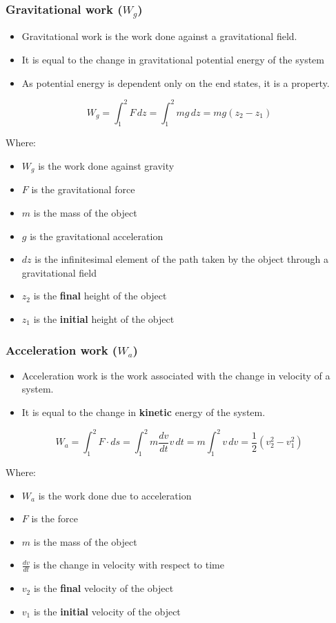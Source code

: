 \documentclass[11pt]{article}
\begin{document}
\subsubsection{Gravitational work (\(W_g\))}
\label{sec:org1002f04}
\begin{itemize}
\item Gravitational work is the work done against a gravitational field.
\item It is equal to the change in gravitational potential energy of the system
\item As potential energy is dependent only on the end states, it is a property.
\end{itemize}

\[W_g = \int_1^2 F \, dz = \int_1^2 mg \, dz = mg(z_2 - z_1)\]

Where:
\begin{itemize}
\item \(W_g\) is the work done against gravity
\item \(F\) is the gravitational force
\item \(m\) is the mass of the object
\item \(g\) is the gravitational acceleration
\item \(dz\) is the infinitesimal element of the path taken by the object through a gravitational field
\item \(z_2\) is the \textbf{final} height of the object
\item \(z_1\) is the \textbf{initial} height of the object
\end{itemize}

\newpage

\subsubsection{Acceleration work (\(W_a\))}
\label{sec:org5b522b1}
\begin{itemize}
\item Acceleration work is the work associated with the change in velocity of a system.
\item It is equal to the change in \textbf{kinetic} energy of the system.
\end{itemize}

\[W_a = \int_1^2 F \cdot ds = \int_1^2 m \frac{dv}{dt} v \, dt = m \int_1^2 v \, dv = \frac{1}{2} \left(v_2^2 - v_1^2 \right)\]

Where:
\begin{itemize}
\item \(W_a\) is the work done due to acceleration
\item \(F\) is the force
\item \(m\) is the mass of the object
\item \(\frac{dv}{dt}\) is the change in velocity with respect to time
\item \(v_2\) is the \textbf{final} velocity of the object
\item \(v_1\) is the \textbf{initial} velocity of the object
\end{itemize}
\end{document}
